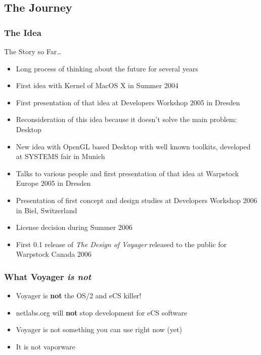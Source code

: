 \documentclass{beamer}
\begin{document}
\subsection{The Journey}
\begin{frame}[allowframebreaks=0.6]
\frametitle{The Idea}
The Story so Far\ldots
\begin{itemize}
  \item Long process of thinking about the future for several years
  \item First idea with Kernel of MacOS X in Summer 2004
  \item First presentation of that idea at Developers Workshop 2005 in Dresden
  \item Reconsideration of this idea because it doesn't solve the main problem: Desktop
  \item New idea with OpenGL based Desktop with well known toolkits, developed at SYSTEMS fair in Munich
  \item Talks to various people and first presentation of that idea at
  Warpstock Europe 2005 in Dresden
  \item Presentation of first concept and design studies at Developers
  Workshop 2006 in Biel, Switzerland
  \item License decision during Summer 2006
  \item First 0.1 release of \textit{The Design of Voyager} released to the
  public for Warpstock Canada 2006
\end{itemize}
\end{frame}

\begin{frame}
\frametitle{What Voyager \textit{is not}}
\begin{itemize}
  \item Voyager is \textbf{not} the OS/2 and eCS killer!
  \item netlabs.org will \textbf{not} stop development for eCS software
  \item Voyager is not something you can use right now (yet)
  \item It is not vaporware
\end{itemize}
\end{frame}
\end{document}
